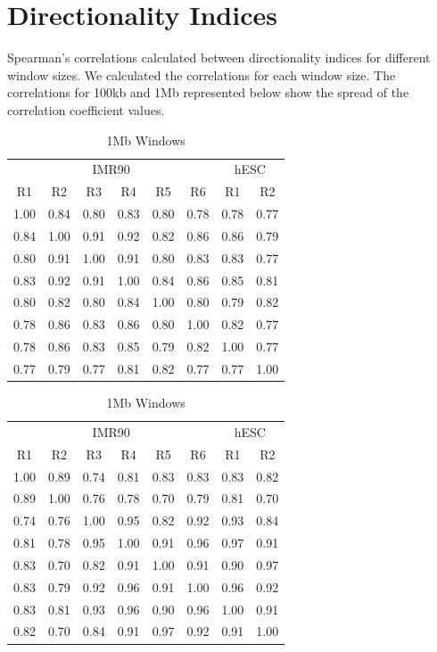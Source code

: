 \newpage
\section*{Directionality Indices}\label{sec:SuppDirectionality}

Spearman's correlations calculated between directionality indices for different window sizes.  We calculated the
correlations for each window size.  The correlations for 100kb and 1Mb represented below show the spread of the
correlation coefficient values.

\begin{table}[H]
  \caption{Directionality Indices}
  \parbox{.45\linewidth}{%
    \centering
    \tiny
    \caption{100kb Windows}\label{tab:SuppDi100kbWindows}
    \begin{tabular}{*{8}{c}}
      \toprule
      \multicolumn{6}{c}{IMR90} & \multicolumn{2}{c}{hESC} \\
      R1 & R2 & R3 & R4 & R5 & R6 & R1 & R2 \\
      \midrule
      1.00 & 0.84 & 0.80 & 0.83 & 0.80 & 0.78 & 0.78 & 0.77 \\
      0.84 & 1.00 & 0.91 & 0.92 & 0.82 & 0.86 & 0.86 & 0.79 \\
      0.80 & 0.91 & 1.00 & 0.91 & 0.80 & 0.83 & 0.83 & 0.77 \\
      0.83 & 0.92 & 0.91 & 1.00 & 0.84 & 0.86 & 0.85 & 0.81 \\
      0.80 & 0.82 & 0.80 & 0.84 & 1.00 & 0.80 & 0.79 & 0.82 \\
      0.78 & 0.86 & 0.83 & 0.86 & 0.80 & 1.00 & 0.82 & 0.77 \\
      0.78 & 0.86 & 0.83 & 0.85 & 0.79 & 0.82 & 1.00 & 0.77 \\
      0.77 & 0.79 & 0.77 & 0.81 & 0.82 & 0.77 & 0.77 & 1.00 \\
      \bottomrule
    \end{tabular}
  }%
  \hfill
  \parbox{.45\linewidth}{%
    \centering
    \tiny
    \caption{1Mb Windows}\label{tab:SuppDi1MBWindows}
    \begin{tabular}{*{8}{c}}
      \toprule
      \multicolumn{6}{c}{IMR90} & \multicolumn{2}{c}{hESC} \\
      R1 & R2 & R3 & R4 & R5 & R6 & R1 & R2 \\
      \midrule
      1.00 & 0.89 & 0.74 & 0.81 & 0.83 & 0.83 & 0.83 & 0.82 \\
      0.89 & 1.00 & 0.76 & 0.78 & 0.70 & 0.79 & 0.81 & 0.70 \\
      0.74 & 0.76 & 1.00 & 0.95 & 0.82 & 0.92 & 0.93 & 0.84 \\
      0.81 & 0.78 & 0.95 & 1.00 & 0.91 & 0.96 & 0.97 & 0.91 \\
      0.83 & 0.70 & 0.82 & 0.91 & 1.00 & 0.91 & 0.90 & 0.97 \\
      0.83 & 0.79 & 0.92 & 0.96 & 0.91 & 1.00 & 0.96 & 0.92 \\
      0.83 & 0.81 & 0.93 & 0.96 & 0.90 & 0.96 & 1.00 & 0.91 \\
      0.82 & 0.70 & 0.84 & 0.91 & 0.97 & 0.92 & 0.91 & 1.00 \\
      \bottomrule
    \end{tabular}
  }
\end{table}


